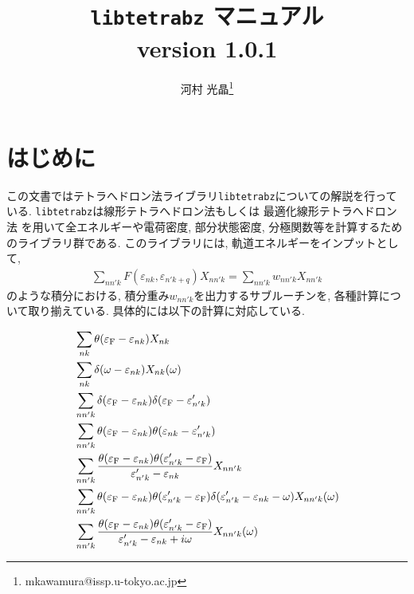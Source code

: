 \documentclass[12pt]{jarticle}
\begin{document}
%
%
\title{\texttt{libtetrabz} マニュアル \\
version 1.0.1}
\author{河村 光晶\footnote{mkawamura@issp.u-tokyo.ac.jp}}
\maketitle

\tableofcontents

\section{はじめに}

この文書ではテトラへドロン法ライブラリ\verb|libtetrabz|についての解説を行っている. 
\verb|libtetrabz|は線形テトラへドロン法もしくは
最適化線形テトラへドロン法\cite{PhysRevB.89.094515}
を用いて全エネルギーや電荷密度, 部分状態密度, 分極関数等を計算するためのライブラリ群である. 
このライブラリには, 軌道エネルギーをインプットとして, 
\begin{align}
\sum_{n n' k} F(\varepsilon_{n k}, \varepsilon_{n' k+q})X_{n n' k}
=
\sum_{n n' k} w_{n n' k} X_{n n' k}
\end{align}
のような積分における, 積分重み$w_{n n' k}$を出力するサブルーチンを, 
各種計算について取り揃えている. 
具体的には以下の計算に対応している.

\begin{align}
&\sum_{n k} \theta(\varepsilon_{\rm F} - \varepsilon_{n k}) X_{n k}
\\
&\sum_{n k} \delta(\omega - \varepsilon_{n k}) X_{n k}(\omega)
\\
&\sum_{n n' k} \delta(\varepsilon_{\rm F} - \varepsilon_{n k})
\delta(\varepsilon_{\rm F} - \varepsilon'_{n' k})
\\
&\sum_{n n' k} \theta(\varepsilon_{\rm F} - \varepsilon_{n k})
\theta(\varepsilon_{n k} - \varepsilon'_{n' k})
\\
&\sum_{n n' k} \frac{\theta(\varepsilon_{\rm F} - \varepsilon_{n k})
  \theta(\varepsilon'_{n' k} - \varepsilon_{\rm F})}
    {\varepsilon'_{n' k} - \varepsilon_{n k}} X_{n n' k}
\\
&\sum_{n n' k} \theta(\varepsilon_{\rm F} - \varepsilon_{n k})
\theta(\varepsilon'_{n' k} - \varepsilon_{\rm F})
\delta(\varepsilon'_{n' k} - \varepsilon_{n k} - \omega) X_{n n' k}(\omega)
\\
&\sum_{n n' k} \frac{\theta(\varepsilon_{\rm F} - \varepsilon_{n k})
  \theta(\varepsilon'_{n' k} - \varepsilon_{\rm F})}
    {\varepsilon'_{n' k} - \varepsilon_{n k} + i \omega} X_{n n' k}(\omega)
\end{align}
\end{document}
